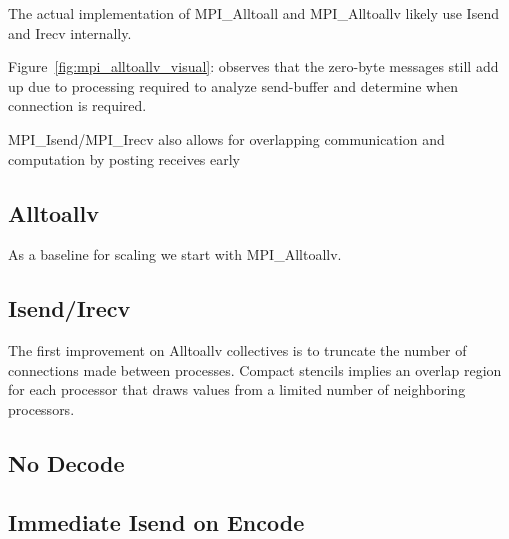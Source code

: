 \documentclass{report}
\begin{document}
The actual implementation of MPI\_Alltoall and MPI\_Alltoallv likely use Isend and Irecv internally. 


Figure~\ref{fig:mpi_alltoallv_visual}: observes that the zero-byte messages still add up due to processing required to analyze send-buffer and determine when connection is required. 



MPI\_Isend/MPI\_Irecv also allows for overlapping communication and computation by posting receives early 

\subsection{Alltoallv}
As a baseline for scaling we start with MPI\_Alltoallv. 


\subsection{Isend/Irecv}

The first improvement on Alltoallv collectives is to truncate the number of connections made between processes. Compact stencils implies an overlap region for each processor that draws values from a limited number of neighboring processors. 


\subsection{No Decode}


\subsection{Immediate Isend on Encode}


\end{document}
